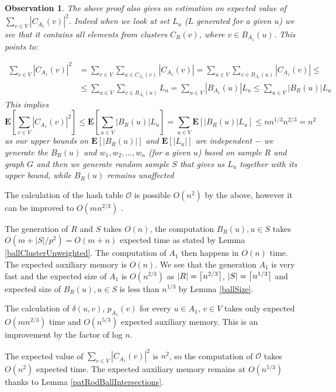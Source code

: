 \documentclass[shortabstract, lic, english]{iithesis}
\theoremstyle{definition} \newtheorem{definition}{Definition}[chapter]
\theoremstyle{plain} \newtheorem{remark}[definition]{Observation}
\theoremstyle{plain} \newtheorem{theorem}[definition]{Theorem}
\theoremstyle{plain} \newtheorem{lemma}[definition]{Lemma}
\theoremstyle{plain} \newtheorem{conjecture}[definition]{Conjecture}
\DeclarePairedDelimiter{\ceil}{\lceil}{\rceil}
\begin{document}
\begin{remark}
    The above proof also gives an estimation on expected value of $\sum_{v \in V}|C_{A_1}(v)|^2$.
    Indeed when we look at set $L_u$ ($L$ generated for a given $u$) we see that it contains all elements from clusters $C_R(v)$, where $v \in B_{A_1}(u)$.
    This points to:

    \begin{align}
    \sum_{v \in V}|C_{A_1}(v)|^2 &= \sum_{v \in V}\sum_{u \in C_{A_1}(v)}|C_{A_1}(v)| = \sum_{u \in V}\sum_{v \in B_{A_1}(u)} |C_{A_1}(v)| \leq \nonumber \\
    &\leq \sum_{u \in V}\sum_{v \in B_{A_1}(u)} L_u = \sum_{u \in V} |B_{A_1}(u)|  L_u \leq \sum_{u \in V} |B_R(u)|  L_u \nonumber
    \end{align}
    This implies
    $$\mathbf{E}[\sum_{v \in V}|C_{A_1}(v)|^2] \leq \mathbf{E}[\sum_{u \in V} |B_R(u)|  L_u] = \sum_{u \in V} \mathbf{E}[|B_R(u)|  L_u] \leq n  n^{1/3}  n^{2/3} = n^2$$
    as our upper bounds on $\mathbf{E}[|B_R(u)|]$ and $\mathbf{E}[|L_u|]$ are independent $-$ we generate the $B_R(u)$ and $w_1, w_2, \ldots, w_n$ (for a given $u$) based on sample $R$ and graph $G$
    and then we generate random sample $S$ that gives us $L_u$ together with its upper bound, while $B_R(u)$ remains unaffected
\end{remark}

The calculation of the hash table $\mathcal{O}$ is possible $O(n^2)$ by the above, however it can be improved to $O(mn^{2/3})$ \cite{21OracleSpannerNoPenaltyNoLog}.

The generation of $R$ and $S$ takes $O(n)$,
the computation $B_R(u), u \in S$ takes $O(m + |S|/p^2) = O(m + n)$ expected time as stated by Lemma \ref{ballClusterUnweighted}.
The computation of $A_1$ then happens in $O(n)$ time. The expected auxiliary memory is $O(n)$.
We see that the generation $A_1$ is very fast and the expected size of $A_1$ is $O(n^{2/3})$
as $|R| = \ceil[\big]{n^{2/3}}$, $|S| = \ceil[\big]{n^{1/3}}$ and expected size of $B_R(u), u \in S$ is less than $n^{1/3}$ by Lemma \ref{ballSize}.

The calculation of $\delta(u,v)$, $p_{A_1}(v)$ for every $u \in A_1$, $v \in V$ takes only expected $O(mn^{2/3})$ time and $O(n^{5/3})$ expected auxiliary memory.
This is an improvement by the factor of log $n$.

The expected value of $\sum_{v \in V}|C_{A_1}(v)|^2$ is $n^2$, so the computation of $\mathcal{O}$ takes $O(n^2)$ expected time.
The expected auxiliary memory remains at $O(n^{5/3})$ thanks to Lemma \ref{patRodBallIntersections}.
\end{document}
